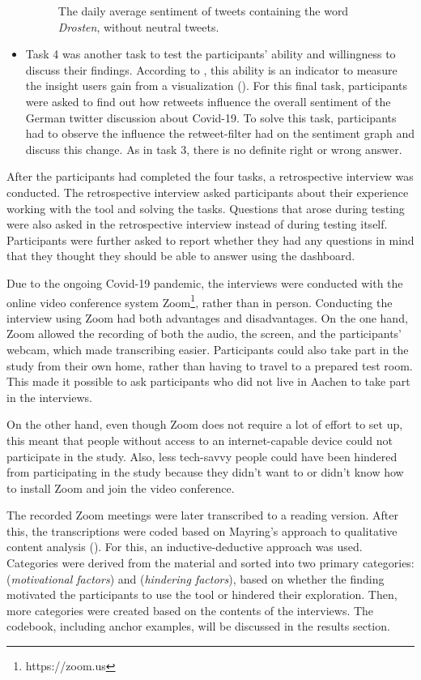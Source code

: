\begin{itemize}
\begin{figure}[htb]
        \caption{The daily average sentiment of tweets containing the word \emph{Drosten}, without neutral tweets.}
        \label{fig:sentiment_drosten_noneutral}
    \end{figure}
    \item Task 4 was another task to test the participants' ability and willingness to discuss their findings. According to \citeauthor{northMeasuringVisualizationInsight2006}, this ability is an indicator to measure the insight users gain from a visualization (\cite{northMeasuringVisualizationInsight2006}). For this final task, participants were asked to find out how retweets influence the overall sentiment of the German twitter discussion about Covid-19. To solve this task, participants had to observe the influence the retweet-filter had on the sentiment graph and discuss this change. As in task 3, there is no definite right or wrong answer.
\end{itemize}

After the participants had completed the four tasks, a retrospective interview was conducted. The retrospective interview asked participants about their experience working with the tool and solving the tasks. Questions that arose during testing were also asked in the retrospective interview instead of during testing itself. Participants were further asked to report whether they had any questions in mind that they thought they should be able to answer using the dashboard.

Due to the ongoing Covid-19 pandemic, the interviews were conducted with the online video conference system Zoom\footnote{https://zoom.us}, rather than in person. Conducting the interview using Zoom had both advantages and disadvantages. On the one hand, Zoom allowed the recording of both the audio, the screen, and the participants' webcam, which made transcribing easier. Participants could also take part in the study from their own home, rather than having to travel to a prepared test room. This made it possible to ask participants who did not live in Aachen to take part in the interviews.

On the other hand, even though Zoom does not require a lot of effort to set up, this meant that people without access to an internet-capable device could not participate in the study. Also, less tech-savvy people could have been hindered from participating in the study because they didn't want to or didn't know how to install Zoom and join the video conference.

The recorded Zoom meetings were later transcribed to a reading version. After this, the transcriptions were coded based on Mayring's approach to qualitative content analysis (\cite{mayring2010qualitative}). For this, an inductive-deductive approach was used. Categories were derived from the material and sorted into two primary categories:  (\emph{motivational factors}) and  (\emph{hindering factors}), based on whether the finding motivated the participants to use the tool or hindered their exploration. Then, more categories were created based on the contents of the interviews. The codebook, including anchor examples, will be discussed in the results section. 

